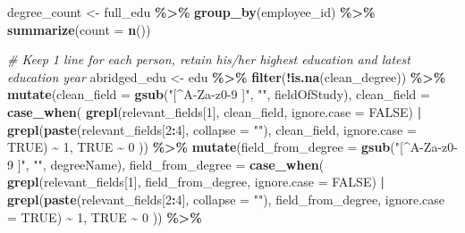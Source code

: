 \documentclass[11pt,]{article}
\newenvironment{Shaded}{\begin{snugshade}}{\end{snugshade}}
\newcommand{\AttributeTok}[1]{\textcolor[rgb]{0.13,0.29,0.53}{#1}}
\newcommand{\CommentTok}[1]{\textcolor[rgb]{0.56,0.35,0.01}{\textit{#1}}}
\newcommand{\ConstantTok}[1]{\textcolor[rgb]{0.56,0.35,0.01}{#1}}
\newcommand{\DecValTok}[1]{\textcolor[rgb]{0.00,0.00,0.81}{#1}}
\newcommand{\FunctionTok}[1]{\textcolor[rgb]{0.13,0.29,0.53}{\textbf{#1}}}
\newcommand{\NormalTok}[1]{#1}
\newcommand{\OtherTok}[1]{\textcolor[rgb]{0.56,0.35,0.01}{#1}}
\newcommand{\SpecialCharTok}[1]{\textcolor[rgb]{0.81,0.36,0.00}{\textbf{#1}}}
\newcommand{\StringTok}[1]{\textcolor[rgb]{0.31,0.60,0.02}{#1}}
\begin{document}
\begin{Shaded}
\begin{Highlighting}[]
\NormalTok{degree\_count }\OtherTok{\textless{}{-}}\NormalTok{ full\_edu }\SpecialCharTok{\%\textgreater{}\%}
  \FunctionTok{group\_by}\NormalTok{(employee\_id) }\SpecialCharTok{\%\textgreater{}\%} 
  \FunctionTok{summarize}\NormalTok{(}\AttributeTok{count =} \FunctionTok{n}\NormalTok{())}

\CommentTok{\# Keep 1 line for each person, retain his/her highest education and latest education year}
\NormalTok{abridged\_edu }\OtherTok{\textless{}{-}}\NormalTok{ edu }\SpecialCharTok{\%\textgreater{}\%}
  \FunctionTok{filter}\NormalTok{(}\SpecialCharTok{!}\FunctionTok{is.na}\NormalTok{(clean\_degree)) }\SpecialCharTok{\%\textgreater{}\%}
  \FunctionTok{mutate}\NormalTok{(}\AttributeTok{clean\_field =} \FunctionTok{gsub}\NormalTok{(}\StringTok{"[\^{}A{-}Za{-}z0{-}9 ]"}\NormalTok{, }\StringTok{""}\NormalTok{, fieldOfStudy),}
         \AttributeTok{clean\_field =} \FunctionTok{case\_when}\NormalTok{(}
           \FunctionTok{grepl}\NormalTok{(relevant\_fields[}\DecValTok{1}\NormalTok{], clean\_field, }\AttributeTok{ignore.case =} \ConstantTok{FALSE}\NormalTok{) }\SpecialCharTok{|} 
             \FunctionTok{grepl}\NormalTok{(}\FunctionTok{paste}\NormalTok{(relevant\_fields[}\DecValTok{2}\SpecialCharTok{:}\DecValTok{4}\NormalTok{], }\AttributeTok{collapse =} \StringTok{""}\NormalTok{), }
\NormalTok{                   clean\_field, }\AttributeTok{ignore.case =} \ConstantTok{TRUE}\NormalTok{) }\SpecialCharTok{\textasciitilde{}} \DecValTok{1}\NormalTok{,}
           \ConstantTok{TRUE} \SpecialCharTok{\textasciitilde{}} \DecValTok{0}
\NormalTok{         )) }\SpecialCharTok{\%\textgreater{}\%} 
  \FunctionTok{mutate}\NormalTok{(}\AttributeTok{field\_from\_degree =} \FunctionTok{gsub}\NormalTok{(}\StringTok{"[\^{}A{-}Za{-}z0{-}9 ]"}\NormalTok{, }\StringTok{""}\NormalTok{, degreeName),}
         \AttributeTok{field\_from\_degree =} \FunctionTok{case\_when}\NormalTok{(}
           \FunctionTok{grepl}\NormalTok{(relevant\_fields[}\DecValTok{1}\NormalTok{], field\_from\_degree, }\AttributeTok{ignore.case =} \ConstantTok{FALSE}\NormalTok{) }\SpecialCharTok{|} 
             \FunctionTok{grepl}\NormalTok{(}\FunctionTok{paste}\NormalTok{(relevant\_fields[}\DecValTok{2}\SpecialCharTok{:}\DecValTok{4}\NormalTok{], }\AttributeTok{collapse =} \StringTok{""}\NormalTok{), }
\NormalTok{                   field\_from\_degree, }\AttributeTok{ignore.case =} \ConstantTok{TRUE}\NormalTok{) }\SpecialCharTok{\textasciitilde{}} \DecValTok{1}\NormalTok{,}
           \ConstantTok{TRUE} \SpecialCharTok{\textasciitilde{}} \DecValTok{0}
\NormalTok{         ))  }\SpecialCharTok{\%\textgreater{}\%} 

\end{Highlighting}
\end{Shaded}
\end{document}
